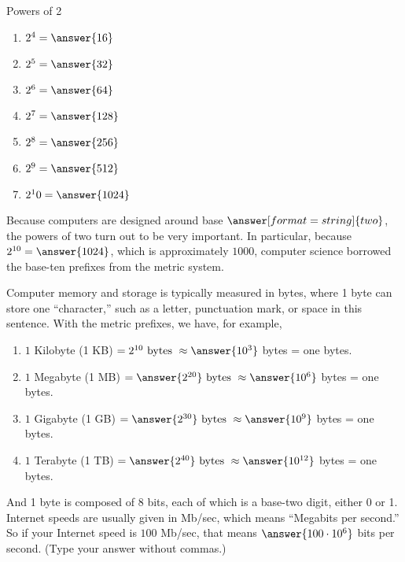 \documentclass[nooutcomes]{ximera}
\begin{document}
\begin{problem}
Powers of 2
\begin{enumerate}
\item $2^4 = \answer{16}$
\item $2^5 = \answer{32}$
\item $2^6 = \answer{64}$
\item $2^7 = \answer{128}$
\item $2^8 = \answer{256}$
\item $2^9 = \answer{512}$
\item $2^10 = \answer{1024}$
\end{enumerate}
\end{problem}

\begin{problem}
Because computers are designed around base $\answer[format=string]{two}$, the powers of two turn out to be very important.  In particular, because $2^{10}=\answer{1024}$, which is approximately $1000$, computer science borrowed the base-ten prefixes from the metric system.  

Computer memory and storage is typically measured in bytes, where 1 byte can store one ``character,'' such as a letter, punctuation mark, or space in this sentence.  With the metric prefixes, we have, for example, 
\begin{enumerate}
\item $1$ Kilobyte (1 KB) $=  2^{10}\textrm{ bytes }\approx \answer{10^3}$ bytes = one  bytes.
\item $1$ Megabyte (1 MB) $=  \answer{2^{20}} \textrm{ bytes } \approx \answer{10^6}$ bytes = one  bytes.
\item $1$ Gigabyte (1 GB) $=  \answer{2^{30}} \textrm{ bytes } \approx \answer{10^9}$ bytes = one  bytes.
\item $1$ Terabyte (1 TB) $=  \answer{2^{40}} \textrm{ bytes } \approx \answer{10^{12}}$ bytes = one  bytes.
\end{enumerate}


And 1 byte is composed of 8 bits, each of which is a base-two digit, either 0 or 1.  Internet speeds are usually given in Mb/sec, which means ``Megabits per second.'' So if your Internet speed is $100$ Mb/sec, 
that means $\answer{100\cdot10^6}$ bits per second.  (Type your answer without commas.)


\end{problem}
\end{document}
